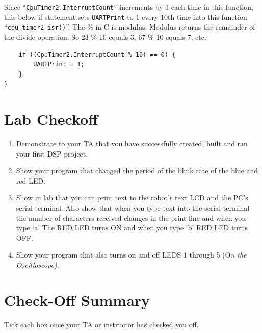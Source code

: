 \documentclass[11pt]{article}
\begin{document}
%
Since “\texttt{CpuTimer2.InterruptCount}” increments by 1 each time in this function, this below if statement sets \texttt{UARTPrint} to 1 every 10th time into this function “\texttt{cpu_timer2_isr()}”. The \% in C is modulus. Modulus returns the remainder of the divide operation. So 23 \% 10 equals 3, 67 \% 10 equals 7, etc.
%
\begin{verbatim}
    if ((CpuTimer2.InterruptCount % 10) == 0) {
        UARTPrint = 1;
    }
}
\end{verbatim}
%
\section*{Lab Checkoff}
%
\begin{enumerate}
    \item Demonstrate to your TA that you have successfully created, built and ran your first DSP project.
    \item Show your program that changed the period of the blink rate of the blue and red LED.
    \item Show in lab that you can print text to the robot’s text LCD and the PC’s serial terminal. Also show that when you type text into the serial terminal the number of characters received changes in the print line and when you type ‘a’ The RED LED turns ON and when you type ‘b’ RED LED turns OFF.
    \item Show your program that also turns on and off LEDS 1 through 5 (O\textit{n the Oscilloscope)}.
\end{enumerate}
%
\section*{Check-Off Summary}

Tick each box once your TA or instructor has checked you off.
%
\CheckOffSummary

\MakeFooter
\end{document}
